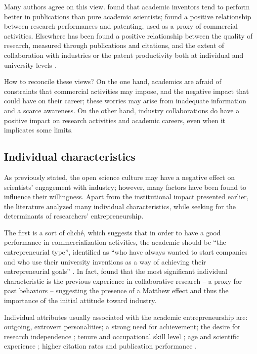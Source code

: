 Many authors agree on this view. \citet{Meyer2006} found that academic inventors tend to perform better in publications than pure academic scientists; \citet{Wong2010} found a positive relationship between research performances and patenting, used as a proxy of commercial activities. Elsewhere has been found a positive relationship between the quality of research, measured through publications and citations, and the extent of collaboration with industries \citep{AzagraCaro2010} or the patent productivity both at individual and university levels \citep{Baldini2007}.

How to reconcile these views? On the one hand, academics are afraid of constraints that commercial activities may impose, and the negative impact that could have on their career; these worries may arise from inadequate information and a scarce awareness. On the other hand, industry collaborations do have a positive impact on research activities and academic careers, even when it implicates some limits.

\subsection{Individual characteristics}

As previously stated, the open science culture may have a negative effect on scientists' engagement with industry; however, many factors have been found to influence their willingness. Apart from the institutional impact presented earlier, the literature analyzed many individual characteristics, while seeking for the determinants of researchers' entrepreneurship.

The first is a sort of cliché, which suggests that in order to have a good performance in commercialization activities, the academic should be \enquote{the entrepreneurial type}, identified as \enquote{who have always wanted to start companies and who use their university inventions as a way of achieving their entrepreneurial goals} \citep{Fini2009}. In fact, \citet{DEste2007} found that the most significant individual characteristic is the previous experience in collaborative research – a proxy for past behaviors – suggesting the presence of a Matthew effect and thus the importance of the initial attitude toward industry.

Individual attributes usually associated with the academic entrepreneurship are: outgoing, extrovert personalities; a strong need for achievement; the desire for research independence \citep{OShea2004}; tenure and occupational skill level \citep{Roberts1991}; age and scientific experience \citep{Audretsch2000}; higher citation rates and publication performance \citep{Zucker2001}.

